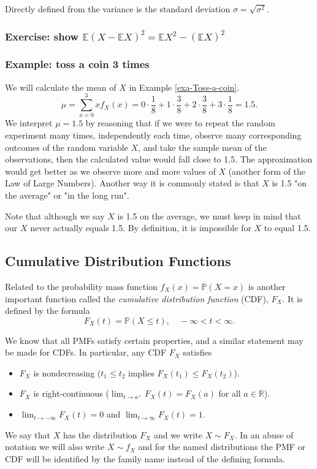 Directly defined from the variance is the
standard deviation \(\sigma=\sqrt{\sigma^{2}}\).

\subsubsection{Exercise: show $\mathbb{E}(X-\mathbb{E}X)^2=\mathbb{E}X^2-(\mathbb{E}X)^2$}

\subsubsection{Example: toss a coin 3 times}

\label{exa-disc-pmf-mean} We will calculate the mean of \(X\) in Example
\ref{exa-Toss-a-coin}.  \[ \mu = \sum_{x = 0}^{3}xf_{X}(x) = 0 \cdot
\frac{1}{8} + 1 \cdot \frac{3}{8} + 2 \cdot
\frac{3}{8}+3\cdot\frac{1}{8} = 1.5. \] We interpret \(\mu = 1.5\) by
reasoning that if we were to repeat the random experiment many times,
independently each time, observe many corresponding outcomes of the
random variable \(X\), and take the sample mean of the observations,
then the calculated value would fall close to 1.5. The approximation
would get better as we observe more and more values of \(X\) (another
form of the Law of Large Numbers).
Another way it is commonly stated is
that \(X\) is 1.5 "on the average" or "in the long run".


\begin{rem}
Note that although we say \(X\) is 1.5 on the average, we must keep in mind that our \(X\) never actually equals 1.5.
By definition, it is impossible for \(X\) to equal 1.5.
\end{rem}

\subsection{Cumulative Distribution Functions}

Related to the probability mass function \(f_{X}(x)=\mathbb{P}(X=x)\)
is another important function called the \emph{cumulative distribution
function} (CDF), \(F_{X}\). It is defined by the formula
\begin{equation}
F_{X}(t)=\mathbb{P}(X\leq t),\quad -\infty < t < \infty.
\end{equation}

We know that all PMFs satisfy certain properties, and a similar
statement may be made for CDFs. In particular, any CDF \(F_{X}\)
satisfies
\begin{itemize}
\item \(F_{X}\) is nondecreasing (\(t_{1}\leq t_{2}\) implies
\(F_{X}(t_{1})\leq F_{X}(t_{2})\)).
\item \(F_{X}\) is right-continuous (\(\lim_{t\to
  a^{+}}F_{X}(t)=F_{X}(a)\) for all \(a\in\mathbb{R}\)).
\item \(\lim_{t\to-\infty}F_{X}(t)=0\) and
\(\lim_{t\to\infty}F_{X}(t)=1\).
\end{itemize}
We say that \(X\) has the distribution \(F_{X}\) and we write \(X\sim
F_{X}\). In an abuse of notation we will also write \(X\sim f_{X}\)
and for the named distributions the PMF or CDF will be identified by
the family name instead of the defining formula.


